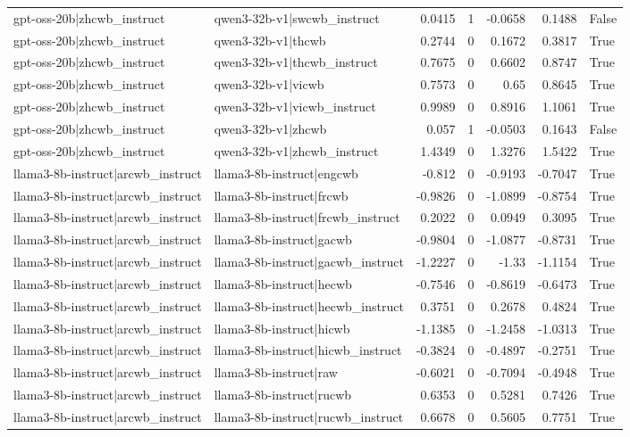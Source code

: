 \begin{table}
\begin{tabular}{l l r r r r l}
gpt-oss-20b|zhcwb_instruct & qwen3-32b-v1|swcwb_instruct & 0.0415 & 1 & -0.0658 & 0.1488 & False \\
gpt-oss-20b|zhcwb_instruct & qwen3-32b-v1|thcwb & 0.2744 & 0 & 0.1672 & 0.3817 & True \\
gpt-oss-20b|zhcwb_instruct & qwen3-32b-v1|thcwb_instruct & 0.7675 & 0 & 0.6602 & 0.8747 & True \\
gpt-oss-20b|zhcwb_instruct & qwen3-32b-v1|vicwb & 0.7573 & 0 & 0.65 & 0.8645 & True \\
gpt-oss-20b|zhcwb_instruct & qwen3-32b-v1|vicwb_instruct & 0.9989 & 0 & 0.8916 & 1.1061 & True \\
gpt-oss-20b|zhcwb_instruct & qwen3-32b-v1|zhcwb & 0.057 & 1 & -0.0503 & 0.1643 & False \\
gpt-oss-20b|zhcwb_instruct & qwen3-32b-v1|zhcwb_instruct & 1.4349 & 0 & 1.3276 & 1.5422 & True \\
llama3-8b-instruct|arcwb_instruct & llama3-8b-instruct|engcwb & -0.812 & 0 & -0.9193 & -0.7047 & True \\
llama3-8b-instruct|arcwb_instruct & llama3-8b-instruct|frcwb & -0.9826 & 0 & -1.0899 & -0.8754 & True \\
llama3-8b-instruct|arcwb_instruct & llama3-8b-instruct|frcwb_instruct & 0.2022 & 0 & 0.0949 & 0.3095 & True \\
llama3-8b-instruct|arcwb_instruct & llama3-8b-instruct|gacwb & -0.9804 & 0 & -1.0877 & -0.8731 & True \\
llama3-8b-instruct|arcwb_instruct & llama3-8b-instruct|gacwb_instruct & -1.2227 & 0 & -1.33 & -1.1154 & True \\
llama3-8b-instruct|arcwb_instruct & llama3-8b-instruct|hecwb & -0.7546 & 0 & -0.8619 & -0.6473 & True \\
llama3-8b-instruct|arcwb_instruct & llama3-8b-instruct|hecwb_instruct & 0.3751 & 0 & 0.2678 & 0.4824 & True \\
llama3-8b-instruct|arcwb_instruct & llama3-8b-instruct|hicwb & -1.1385 & 0 & -1.2458 & -1.0313 & True \\
llama3-8b-instruct|arcwb_instruct & llama3-8b-instruct|hicwb_instruct & -0.3824 & 0 & -0.4897 & -0.2751 & True \\
llama3-8b-instruct|arcwb_instruct & llama3-8b-instruct|raw & -0.6021 & 0 & -0.7094 & -0.4948 & True \\
llama3-8b-instruct|arcwb_instruct & llama3-8b-instruct|rucwb & 0.6353 & 0 & 0.5281 & 0.7426 & True \\
llama3-8b-instruct|arcwb_instruct & llama3-8b-instruct|rucwb_instruct & 0.6678 & 0 & 0.5605 & 0.7751 & True \\

\end{tabular}
\end{table}
